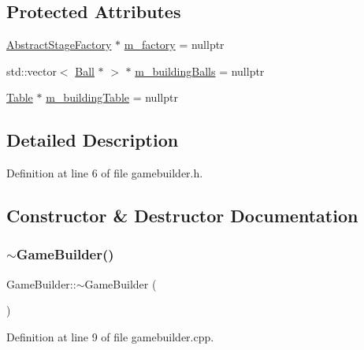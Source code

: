 \subsection*{Protected Attributes}
\begin{DoxyCompactItemize}
\item 
\mbox{\hyperlink{class_abstract_stage_factory}{Abstract\+Stage\+Factory}} $\ast$ \mbox{\hyperlink{class_game_builder_a2b8da37dc88d521fc01841a2c308508f}{m\+\_\+factory}} = nullptr
\item 
std\+::vector$<$ \mbox{\hyperlink{class_ball}{Ball}} $\ast$ $>$ $\ast$ \mbox{\hyperlink{class_game_builder_a00bf40f2a9c4c72ff8e9bc94201bb681}{m\+\_\+building\+Balls}} = nullptr
\item 
\mbox{\hyperlink{class_table}{Table}} $\ast$ \mbox{\hyperlink{class_game_builder_a0fe16583df85f0360cfe9b06a7ea3aee}{m\+\_\+building\+Table}} = nullptr
\end{DoxyCompactItemize}


\subsection{Detailed Description}


Definition at line 6 of file gamebuilder.\+h.



\subsection{Constructor \& Destructor Documentation}
\mbox{\label{class_game_builder_ad817a2588d910c2798dfb27808c29d48}} 
\subsubsection{\texorpdfstring{$\sim$\+Game\+Builder()}{~GameBuilder()}}
{\footnotesize\ttfamily Game\+Builder\+::$\sim$\+Game\+Builder (\begin{DoxyParamCaption}{ }\end{DoxyParamCaption})\hspace{0.3cm}{\ttfamily [virtual]}}



Definition at line 9 of file gamebuilder.\+cpp.

\mbox{\label{class_game_builder_a1540d75dc9f7beb42a95bbc083f86ae1}} 

